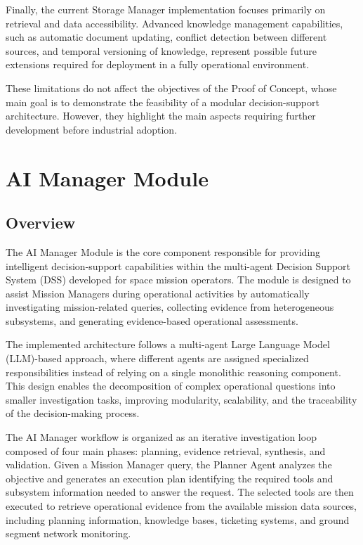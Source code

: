 Finally, the current Storage Manager implementation focuses primarily on retrieval and data accessibility. Advanced knowledge management capabilities, such as automatic document updating, conflict detection between different sources, and temporal versioning of knowledge, represent possible future extensions required for deployment in a fully operational environment.

These limitations do not affect the objectives of the Proof of Concept, whose main goal is to demonstrate the feasibility of a modular decision-support architecture. However, they highlight the main aspects requiring further development before industrial adoption.

\section{AI Manager Module}

\subsection{Overview}

The AI Manager Module is the core component responsible for providing intelligent decision-support capabilities within the multi-agent Decision Support System (DSS) developed for space mission operators. The module is designed to assist Mission Managers during operational activities by automatically investigating mission-related queries, collecting evidence from heterogeneous subsystems, and generating evidence-based operational assessments.

The implemented architecture follows a multi-agent Large Language Model (LLM)-based approach, where different agents are assigned specialized responsibilities instead of relying on a single monolithic reasoning component. This design enables the decomposition of complex operational questions into smaller investigation tasks, improving modularity, scalability, and the traceability of the decision-making process.

The AI Manager workflow is organized as an iterative investigation loop composed of four main phases: planning, evidence retrieval, synthesis, and validation. Given a Mission Manager query, the Planner Agent analyzes the objective and generates an execution plan identifying the required tools and subsystem information needed to answer the request. The selected tools are then executed to retrieve operational evidence from the available mission data sources, including planning information, knowledge bases, ticketing systems, and ground segment network monitoring.

